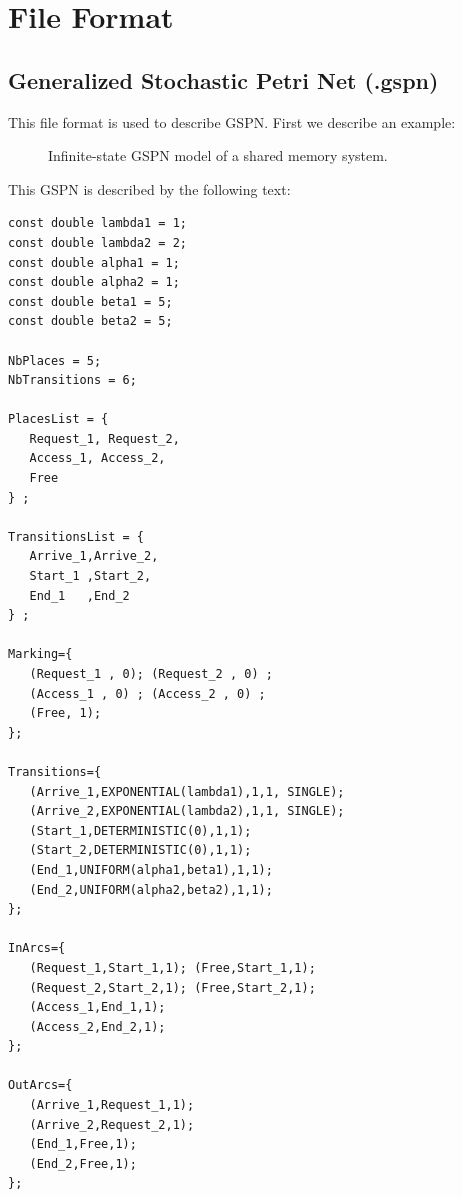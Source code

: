 \documentclass{article}
\begin{document}
\section{File Format}
\label{sec:fileformat}
\subsection{Generalized Stochastic Petri Net (.gspn)}
This file format is used to describe GSPN.
First we describe an example:\\
\begin{figure}[h]
  \centering
  
  \caption{Infinite-state GSPN  model of a shared memory system.}
  \label{fig:sharedmem}
\end{figure}
This GSPN is described by the following text:
\begin{verbatim}
const double lambda1 = 1;
const double lambda2 = 2;
const double alpha1 = 1;
const double alpha2 = 1;
const double beta1 = 5;
const double beta2 = 5;

NbPlaces = 5;
NbTransitions = 6;

PlacesList = { 
   Request_1, Request_2,
   Access_1, Access_2,
   Free
} ;

TransitionsList = { 
   Arrive_1,Arrive_2,
   Start_1 ,Start_2,
   End_1   ,End_2
} ;

Marking={
   (Request_1 , 0); (Request_2 , 0) ; 
   (Access_1 , 0) ; (Access_2 , 0) ;
   (Free, 1);
};

Transitions={
   (Arrive_1,EXPONENTIAL(lambda1),1,1, SINGLE); 
   (Arrive_2,EXPONENTIAL(lambda2),1,1, SINGLE);
   (Start_1,DETERMINISTIC(0),1,1); 
   (Start_2,DETERMINISTIC(0),1,1);
   (End_1,UNIFORM(alpha1,beta1),1,1); 
   (End_2,UNIFORM(alpha2,beta2),1,1);
};

InArcs={
   (Request_1,Start_1,1); (Free,Start_1,1);
   (Request_2,Start_2,1); (Free,Start_2,1);
   (Access_1,End_1,1);
   (Access_2,End_2,1);
};

OutArcs={
   (Arrive_1,Request_1,1); 
   (Arrive_2,Request_2,1);
   (End_1,Free,1);
   (End_2,Free,1);
};
\end{verbatim}
\end{document}
